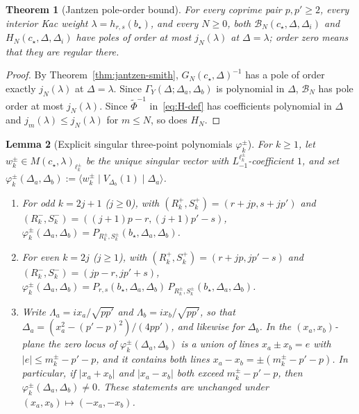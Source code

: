 \documentclass[twoside,10pt]{article}
\numberwithin{equation}{section}
\theoremstyle{slbody}
\newtheorem{theorem}{Theorem}[section]
\newtheorem{lemma}[theorem]{Lemma}
\theoremstyle{definition}
\theoremstyle{remark}
\begin{document}
\begin{theorem}[Jantzen pole-order bound]\label{thm:jantzen-bound}
For every coprime pair \(p,p'\geq2\), every interior Kac weight
\(\lambda=h_{r,s}(b_\star)\), and every \(N\geq0\), both
\(\mathcal B_N(c_\star,\Delta,\Delta_i)\) and
\(H_N(c_\star,\Delta,\Delta_i)\) have poles of order at most \(j_N(\lambda)\)
at \(\Delta=\lambda\); order zero means that they are regular there.
\end{theorem}

\begin{proof}
By Theorem~\ref{thm:jantzen-smith}, \(G_N(c_\star,\Delta)^{-1}\) has a pole of order exactly
\(j_N(\lambda)\) at \(\Delta=\lambda\).  Since
\(\Gamma_Y(\Delta;\Delta_a,\Delta_b)\) is polynomial in \(\Delta\),
\(\mathcal B_N\) has pole order at most \(j_N(\lambda)\).  Since
\(\widetilde\Phi^{-1}\) in~\eqref{eq:H-def} has coefficients polynomial in
\(\Delta\) and \(j_m(\lambda)\leq j_N(\lambda)\) for \(m\leq N\), so does
\(H_N\).
\end{proof}

\begin{lemma}[Explicit singular three-point polynomials \(\varphi^\pm_k\)]
\label{lem:pi-factorization}
For \(k\geq1\), let \(w^\pm_k\in M(c_\star,\lambda)_{\ell^\pm_k}\) be the
unique singular vector with \(L_{-1}^{\ell^\pm_k}\)-coefficient \(1\), and
set \(\varphi^\pm_k(\Delta_a,\Delta_b):=\langle w^\pm_k\mid V_{\Delta_b}(1)\mid\Delta_a\rangle\).
\begin{enumerate}\setlength{\itemsep}{1pt}\setlength{\topsep}{3pt}
\item[(i)] For odd \(k=2j+1\) (\(j\geq0\)), with
  \((R^+_k,S^+_k)=(r+jp,s+jp')\) and
  \((R^-_k,S^-_k)=((j+1)p-r,(j+1)p'-s)\),
  \(\varphi^\pm_k(\Delta_a,\Delta_b)=P_{R^\pm_k,S^\pm_k}(b_\star,\Delta_a,\Delta_b)\).
\item[(ii)] For even \(k=2j\) (\(j\geq1\)), with
  \((R^+_k,S^+_k)=(r+jp,jp'-s)\) and \((R^-_k,S^-_k)=(jp-r,jp'+s)\),
  \(\varphi^\pm_k(\Delta_a,\Delta_b)=P_{r,s}(b_\star,\Delta_a,\Delta_b)\,P_{R^\pm_k,S^\pm_k}(b_\star,\Delta_a,\Delta_b)\).
\item[(iii)] Write \(\Lambda_a=ix_a/\sqrt{pp'}\) and
  \(\Lambda_b=ix_b/\sqrt{pp'}\), so that
  \(\Delta_a=(x_a^2-(p'-p)^2)/(4pp')\), and likewise for \(\Delta_b\).  In
  the \((x_a,x_b)\)-plane the zero locus of \(\varphi^\pm_k(\Delta_a,\Delta_b)\) is
  a union of lines \(x_a\pm x_b=e\) with \(|e|\leq m^\pm_k-p'-p\), and it
  contains both lines \(x_a-x_b=\pm(m^\pm_k-p'-p)\).  In particular, if
  \(|x_a+x_b|\) and \(|x_a-x_b|\) both exceed \(m^\pm_k-p'-p\), then
  \(\varphi^\pm_k(\Delta_a,\Delta_b)\neq0\).  These statements are unchanged
  under \((x_a,x_b)\mapsto(-x_a,-x_b)\).
\end{enumerate}
\end{lemma}
\end{document}

